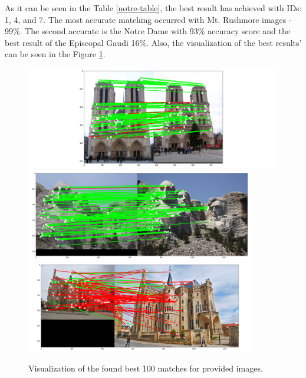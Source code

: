 \documentclass[a4paper]{article}
\begin{document}
As it can be seen in the Table \ref{notre-table}, the best result has achieved with IDs: 1, 4, and 7. The most accurate matching occurred with Mt. Rushmore images - 99\%. The second accurate is the Notre Dame with 93\% accuracy score and the best result of the Episcopal Gaudi 16\%. Also, the visualization of the best results' can be seen in the Figure \ref{notre-result}.

\begin{figure}[!htbp]
\begin{center}
\includegraphics[width=12cm]{notre_dame.png}
\includegraphics[width=10cm]{mt_rushmore.png}
\includegraphics[width=10cm]{eg.png}
\end{center}
\caption{Visualization of the found best 100 matches for provided images.}
\label{notre-result}
\end{figure}

\printbibliography[title=References]
\end{document}
